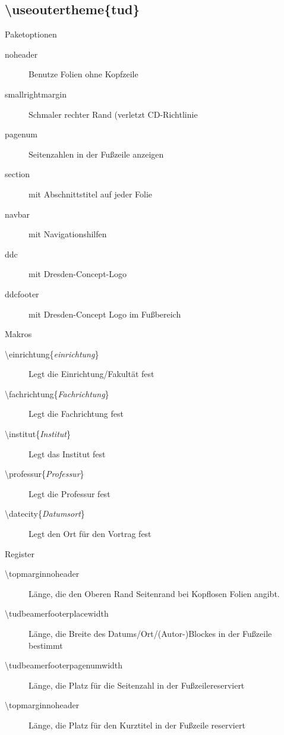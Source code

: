 \documentclass[presentation,t]{beamer}
\begin{document}
\subsection{\textbackslash useoutertheme\{tud\}}
\label{sec-2-2}
\begin{frame}[label=sec-2-2-1]{Paketoptionen}
\begin{description}
\item[{noheader}] Benutze Folien ohne Kopfzeile
\item[{smallrightmargin}] Schmaler rechter Rand (verletzt CD-Richtlinie
\item[{pagenum}] Seitenzahlen in der Fußzeile anzeigen
\item[{section}] mit Abschnittstitel auf jeder Folie
\item[{navbar}] mit Navigationshilfen
\item[{ddc}] mit Dresden-Concept-Logo
\item[{ddcfooter}] mit Dresden-Concept Logo im Fußbereich
\end{description}
\end{frame}
\begin{frame}[label=sec-2-2-2]{Makros}
\begin{description}
\item[{\textbackslash einrichtung\{\emph{einrichtung}\}}] Legt die
Einrichtung/Fakultät fest
\item[{\textbackslash fachrichtung\{\emph{Fachrichtung}\}}] Legt die
Fachrichtung fest
\item[{\textbackslash institut\{\emph{Institut}\}}] Legt das
Institut fest
\item[{\textbackslash professur\{\emph{Professur}\}}] Legt die
Professur fest
\item[{\textbackslash datecity\{\emph{Datumsort}\}}] Legt den Ort für den Vortrag fest
\end{description}
\end{frame}
\begin{frame}[label=sec-2-2-3]{Register}
\begin{description}
\item[{\textbackslash topmarginnoheader}] Länge, die den Oberen Rand Seitenrand bei
Kopflosen Folien angibt.
\item[{\textbackslash tudbeamerfooterplacewidth}] Länge, die Breite des
Datums/Ort/(Autor-)Blockes in der Fußzeile bestimmt
\item[{\textbackslash tudbeamerfooterpagenumwidth}] Länge, die Platz für
die Seitenzahl in der Fußzeilereserviert
\item[{\textbackslash topmarginnoheader}] Länge, die Platz für den
Kurztitel in der Fußzeile reserviert
\end{description}
\end{frame}
\end{document}
